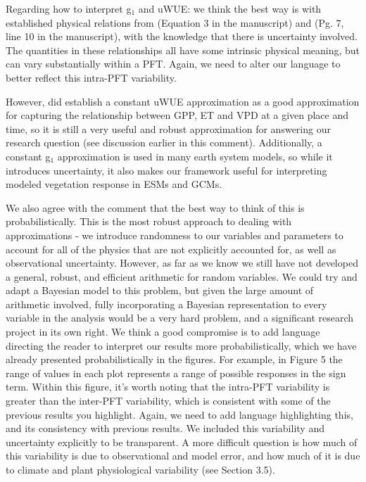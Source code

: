 \documentclass[12pt]{article}
\begin{document}
Regarding how to interpret g$_1$ and uWUE: we think the best way
is with established physical relations from \cite{MEDLYN_2011}
(Equation 3 in the manuscript) and \cite{Zhou_2014} (Pg. 7, line 10 in
the manuscript), with the knowledge that there is uncertainty
involved. The quantities in these relationships all have some
intrinsic physical meaning, but can vary substantially within a
PFT. Again, we need to alter our language to better reflect this
intra-PFT variability.

However, \cite{Zhou_2014} did establish a constant uWUE approximation
as a good approximation for capturing the relationship between GPP, ET
and VPD at a given place and time, so it is still a very useful and
robust approximation for answering our research question (see
discussion earlier in this comment). Additionally, a constant g$_1$
approximation is used in many earth system models, so while it
introduces uncertainty, it also makes our framework useful for
interpreting modeled vegetation response in ESMs and GCMs.

We also agree with the comment that the best way to think of this is
probabilistically. This is the most robust approach to dealing with
approximations - we introduce randomness to our variables and
parameters to account for all of the physics that are not explicitly
accounted for, as well as observational uncertainty. However, as far
as we know we still have not developed a general, robust, and efficient
arithmetic for random variables. We could try and adapt a Bayesian
model to this problem, but given the large amount of arithmetic
involved, fully incorporating a Bayesian representation to every
variable in the analysis would be a very hard problem, and a
significant research project in its own right. We think a good
compromise is to add language directing the reader to interpret our
results more probabilistically, which we have already presented
probabilistically in the figures. For example, in Figure 5 the range of
values in each plot represents a range of possible responses in the
sign term. Within this figure, it's worth noting that the intra-PFT
variability is greater than the inter-PFT variability, which is
consistent with some of the previous results you highlight. Again, we
need to add language highlighting this, and its consistency with
previous results. We included this variability and uncertainty
explicitly to be transparent. A more difficult question is how much of
this variability is due to observational and model error, and how much
of it is due to climate and plant physiological variability (see
Section 3.5).
\end{document}
